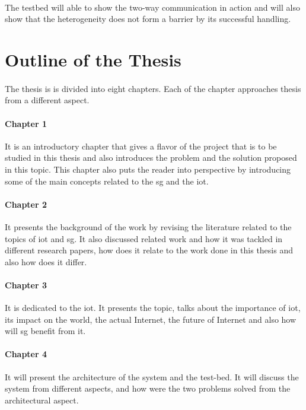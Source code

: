 \documentclass[oneside,12pt,a4paper,final]{book}
\begin{document}
\paragraph{}
The testbed will able to show the two-way communication in action and will also show that the heterogeneity does not form a barrier by its successful handling.

\section{Outline of the Thesis}
\paragraph{}
The thesis is is divided into eight chapters. Each of the chapter approaches thesis from a different aspect. 
\paragraph{Chapter 1}
It is an introductory chapter that gives a flavor of the project that is to be studied in this thesis and also introduces the problem and the solution proposed in this topic. This chapter also puts the reader into perspective by introducing some of the main concepts related to the \gls{sg} and the \gls{iot}. 
\paragraph{Chapter 2}
It presents the background of the work by revising the literature related to the topics of \gls{iot} and \gls{sg}. It also discussed related work and how it was tackled in different research papers, how does it relate to the work done in this thesis and also how does it differ.
\paragraph{Chapter 3}
It is dedicated to the \gls{iot}. It presents the topic, talks about the importance of \gls{iot}, its impact on the world, the actual Internet, the future of Internet and also how will \gls{sg} benefit from it.
\paragraph{Chapter 4}
It will present the architecture of the system and the test-bed. It will discuss the system from different aspects, and how were the two problems solved from the architectural aspect.
\end{document}
